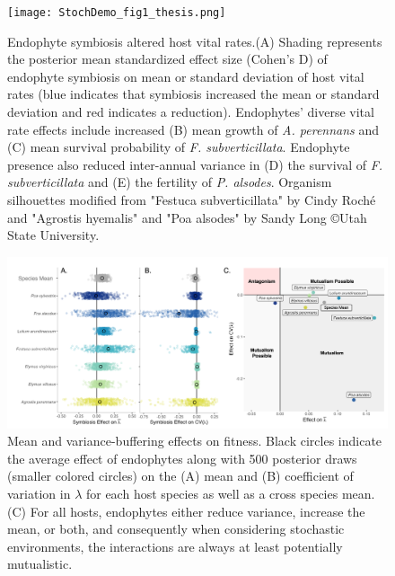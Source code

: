 \documentclass[9pt,twocolumn,twoside]{pnas-new}
\begin{document}
\begin{figure}
	\centering
	\texttt{[image: StochDemo\_fig1\_thesis.png]}
	\caption{Endophyte symbiosis altered host vital rates.(A) Shading represents the posterior mean standardized effect size (Cohen's D) of endophyte symbiosis on mean or standard deviation of host vital rates (blue indicates that symbiosis increased the mean or standard deviation and red indicates a reduction). Endophytes' diverse vital rate effects include increased (B) mean growth of \emph{A. perennans} and (C) mean survival probability of \emph{F. subverticillata}. Endophyte presence also reduced inter-annual variance in (D) the survival of \emph{F. subverticillata} and (E) the fertility of \emph{P. alsodes}. Organism silhouettes modified from "Festuca subverticillata" by Cindy Roch\'e and "Agrostis hyemalis" and "Poa alsodes" by Sandy Long \copyright Utah State University.}
\end{figure}

\begin{figure}
	\centering
	\includegraphics[width =\linewidth]{StochDemo_fig2.png}
	\caption{Mean and variance-buffering effects on fitness. Black circles indicate the average effect of endophytes along with 500 posterior draws (smaller colored circles) on the (A) mean and (B) coefficient of variation in $\lambda$ for each host species as well as a cross species mean. (C) For all hosts, endophytes either reduce variance, increase the mean, or both, and consequently when considering stochastic environments, the interactions are always at least potentially mutualistic.}
\end{figure}
\end{document}
